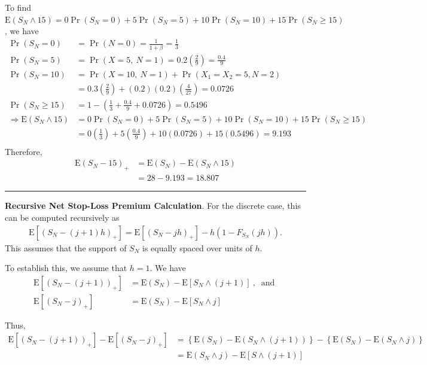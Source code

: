 \documentclass[]{book}
\theoremstyle{definition}
\theoremstyle{definition}
\theoremstyle{definition}
\theoremstyle{remark}
\begin{document}
To find
\(\mathrm{E} (S_N \wedge 15) = 0 \Pr (S_N=0) + 5 \Pr(S_N=5) + 10 \Pr(S_N=10) + 15 \Pr(S_N \geq 15)\),
we have \[\begin{aligned}
\Pr(S_N=0) &= \Pr(N=0) = \frac{1}{1+\beta} = \frac{1}{3} \\
\Pr(S_N=5) &= \Pr(X=5, \ N=1) = 0.2 \left(\frac{2}{9} \right)= \frac{0.4}{9}\\
\Pr(S_N=10) &= \Pr(X=10, \ N=1) + \Pr(X_1=X_2=5, N=2) \\
&= 0.3 \left(\frac{2}{9} \right) + (0.2)(0.2) \left( \frac{4}{27} \right)= 0.0726 \\
\Pr(S_N \geq 15) &= 1 - \left(\frac{1}{3} + \frac{0.4}{9} + 0.0726 \right) = 0.5496\\
\Rightarrow \mathrm{E}(S_N \wedge 15) &= 0 \Pr (S_N=0) + 5 \Pr(S_N=5) + 10 \Pr(S_N=10) + 15 \Pr(S_N \geq 15) \\
&= 0 \left( \frac{1}{3} \right) + 5
\left( \frac{0.4}{9} \right) + 10 (0.0726) + 15 (0.5496) = 9.193\\
\end{aligned}\] Therefore, \[\begin{aligned}
\mathrm{E}(S_N-15)_+ &= \mathrm{E}(S_N) - \mathrm{E}(S_N \wedge 15) \\
&= 28 - 9.193 = 18.807
\end{aligned}\]

\begin{center}\rule{0.5\linewidth}{\linethickness}\end{center}

\textbf{Recursive Net Stop-Loss Premium Calculation}. For the discrete
case, this can be computed recursively as \[\begin{aligned}
\mathrm{E}\left[ \left( S_N-(j+1)h \right) _{+} \right]=\mathrm{E}\left[ ( S_N-jh )_{+} \right] -h \left( 1-F_{S_N}(jh)
\right) .
\end{aligned}\] This assumes that the support of \(S_N\) is equally
spaced over units of \(h\).

To establish this, we assume that \(h=1\). We have \[\begin{aligned}
\mathrm{E}\left[ \left( S_N-(j+1) \right) _{+} \right] &=\mathrm{E}(S_N) - \mathrm{E}[S_N\wedge (j+1)] \ ,\ \text{ and } \\
\mathrm{E}\left[ \left( S_N - j \right)_+ \right] &=\mathrm{E}(S_N) - \mathrm{E}[S_N\wedge j]
\end{aligned}\]

Thus, \[\begin{aligned}
\mathrm{E}\left[ \left(S_N-(j+1) \right) _{+}\right] - \mathrm{E}\left[ ( S_N-j )_{+} \right] 
&= \left\{\mathrm{E}(S_N) - \mathrm{E}(S_N\wedge (j+1)) \right\}   -  \left\{\mathrm{E}(S_N) - \mathrm{E}(S_N\wedge j) \right\} \\
&= \mathrm{E}\left(S_N \wedge j \right) - \mathrm{E}\left[ S \wedge (j+1) \right]
\end{aligned}\]
\end{document}
